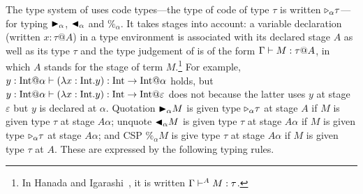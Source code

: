 The type system of \LTP uses code types---the type of code of type
\(\tau\) is written \({\mathop{\triangleright}}_\alpha \tau\)---for typing \({\mathop{\blacktriangleright}}_\alpha\),
\({\mathop{\blacktriangleleft}}_\alpha\) and \(\%_\alpha\).  It takes stages into account: a
variable declaration (written $x:\tau@A$) in a type environment is associated with its
declared stage $A$ as well as its type $\tau$ and the type judgement of \LTP is of
the form $\G \vdash M : \tau@A$, in which $A$ stands for the stage
of term $M$.\footnote{%
  In Hanada and Igarashi~\cite{Hanada2014}, it is written
  $\Gamma \vdash^A M : \tau$.
  }
For example,
$y:\I@\alpha \vdash (\lambda x:\I.y) : \I \to \I @ \alpha$ holds, but
$y:\I@\alpha \vdash (\lambda x:\I.y) : \I \to \I @ \varepsilon$ does
not because the latter uses $y$ at stage \(\varepsilon\) but $y$ is
declared at $\alpha$.  Quotation \({\mathop{\blacktriangleright}}_\alpha M\) is given type
\({\mathop{\triangleright}}_\alpha \tau\) at stage \(A\) if \(M\) is given type \(\tau\) at
stage \(A\alpha\); unquote \({\mathop{\blacktriangleleft}}_\alpha M\) is given type \(\tau\)
at stage \(A\alpha\) if \(M\) is given type \({\mathop{\triangleright}}_\alpha \tau\) at
stage \(A\alpha\); and CSP \(\%_\alpha M\) is give type \(\tau\)
at stage \(A\alpha\) if \(M\) is given type \(\tau\) at \(A\).
These are expressed by the following typing rules.
\begin{center}
	 \hfil
	 \hfil
\end{center}






